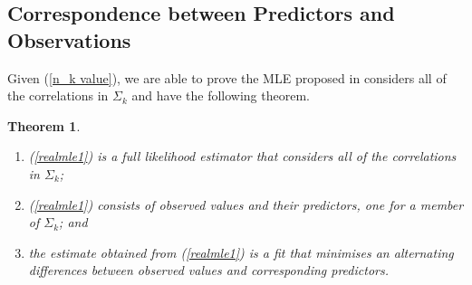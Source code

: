 \documentclass[10pt,onecolumn]{IEEEtran}
\newtheorem{theorem}{\bf Theorem}
\begin{document}
\subsection{Correspondence between Predictors and Observations}

Given  (\ref{n_k value}), we are able to prove the MLE proposed in \cite{CDHT99} considers all of the correlations in $\Sigma_k$ and have the following theorem.

\begin{theorem} \label{minctheorem}

\begin{enumerate}
\item (\ref{realmle1}) is a full likelihood estimator that considers all of the correlations in $\Sigma_k$;
\item (\ref{realmle1}) consists of  observed values and their predictors, one for a member of $\Sigma_k$; and
\item the estimate obtained from (\ref{realmle1})  is a fit that minimises an alternating differences between observed values and corresponding predictors.
    \end{enumerate}
\end{theorem}
\end{document}
